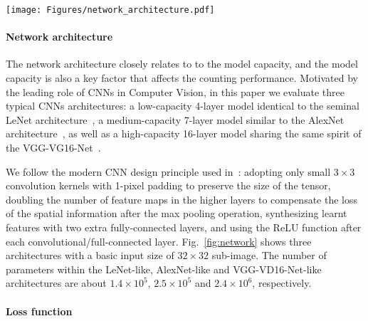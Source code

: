 \documentclass[twocolumn]{bmcart}%
\begin{document}
\begin{figure*}[h!]
	\centering
	\texttt{[image: Figures/network\_architecture.pdf]}
	\caption{Three typical CNN architectures used in Tasselnet.}
	\label{fig:network}
\end{figure*}

\paragraph{Network architecture}

The network architecture closely relates to to the model capacity, and the model capacity is also a key factor that affects the counting performance. Motivated by the leading role of CNNs in Computer Vision, in this paper we evaluate three typical CNNs architectures: a low-capacity 4-layer model identical to the seminal LeNet architecture~\cite{lecun1998gradient}, a medium-capacity 7-layer model similar to the AlexNet architecture~\cite{Krizhevsky2012}, as well as a high-capacity 16-layer model sharing the same spirit of the VGG-VG16-Net~\cite{Simonyan14verydeep}.

We follow the modern CNN design principle used in~\cite{Simonyan14verydeep}: adopting only small $3\times 3$ convolution kernels with 1-pixel padding to preserve the size of the tensor, doubling the number of feature maps in the higher layers to compensate the loss of the spatial information after the max pooling operation, synthesizing learnt features with two extra fully-connected layers, and using the ReLU function after each convolutional/full-connected layer. Fig.~\ref{fig:network} shows three architectures with a basic input size of $32\times 32$ sub-image. The number of parameters within the LeNet-like, AlexNet-like and VGG-VD16-Net-like architectures are about $1.4\times 10^5$, $2.5\times 10^5$ and $2.4\times 10^6$, respectively.

\paragraph{Loss function}
\end{document}
